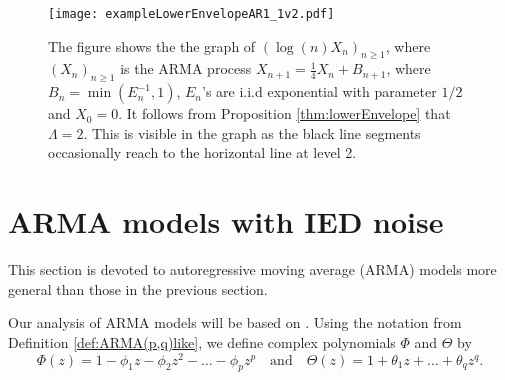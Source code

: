 \documentclass[bj]{imsart}
\numberwithin{equation}{section}
\newcommand{\IGFT}{{\rm IED}}
\newcommand{\1}{\mathbf{1}}
\theoremstyle{definition}
\begin{document}
\begin{figure}%
\begin{center}
 \texttt{[image: exampleLowerEnvelopeAR1\_1v2.pdf]}
\caption{The figure  shows the the  graph of $(\log(n)X_n)_{n\geq 1}$, where $(X_n)_{n\geq 1}$ is the ARMA process $X_{n+1}=\frac{1}{4}X_{n}+B_{n+1}$, where $B_n=\min(E_n^{-1},1)$, $E_n$'s are i.i.d
exponential with parameter $1/2$  and $X_0=0$. It follows from Proposition \ref{thm:lowerEnvelope} that $\Lambda =2$. This is visible in the graph as the black line segments occasionally reach to the horizontal line at level 2.}\label{exampleLowerEnvelopeAR1_1}
\end{center}
\end{figure}

\section{ARMA models with \IGFT{} noise}\label{sec:ARMA}

This section is devoted to autoregressive moving average (ARMA) models more general than those in the previous section.


\medskip

Our analysis of ARMA models will be based on \cite[Chap. 3]{BrockwellDavis}.
Using the notation from  Definition \ref{def:ARMA(p,q)like}, we define complex polynomials $\Phi$ and $\Theta$ by
$$\Phi(z) =1-\phi_1 z-\phi_2 z^2-\ldots -\phi_pz^p \quad \textrm{and}\quad
\Theta(z) = 1+\theta_1z+\ldots + \theta_q z^q.
$$
\end{document}
